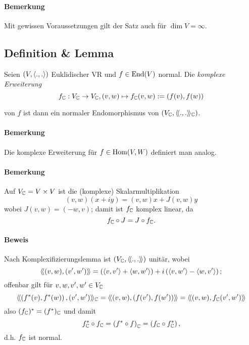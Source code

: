 \paragraph{Bemerkung}
	Mit gewissen Voraussetzungen gilt der Satz auch für $ \dim V = \infty $.

\subsection{Definition \& Lemma}
\begin{Definition}
	Seien $ (V,\langle .,. \rangle) $ Euklidischer VR und $ f\in \operatorname{End}(V) $ normal. Die \emph{komplexe Erweiterung} 
		\[ f_{\mathbb{C}}:V_{\mathbb{C}} \to V_{\mathbb{C}}, (v,w)\mapsto f_{\mathbb{C}}(v,w) := (f(v),f(w)) \]
\end{Definition}
\begin{Lemma}[]
	von $ f $ ist dann ein normaler Endomorphismus von $ (V_{\mathbb{C}},\langle\! \langle .,. \rangle\! \rangle_{\mathbb{C}}) $.
\end{Lemma}
\paragraph{Bemerkung}
	Die komplexe Erweiterung für $ f\in\operatorname{Hom}(V,W) $ definiert man analog.
\paragraph{Bemerkung}
	Auf $ V_{\mathbb{C}} = V\times V $ ist die (komplexe) Skalarmultiplikation
		\[ (v,w)(x+iy) = (v,w)x+J(v,w)y \]
	wobei $ J(v,w) = (-w,v) $; damit ist $ f_{\mathbb{C}} $ komplex linear, da 
		\[ f_{\mathbb{C}} \circ J = J\circ f_{\mathbb{C}}. \]
\paragraph{Beweis}
	Nach Komplexifizierungslemma ist $ (V_{\mathbb{C}},\langle\! \langle .,. \rangle\! \rangle) $ unitär, wobei
		\[ \langle\! \langle (v,w),(v',w') \rangle\! \rangle = \left(\langle v,v' \rangle+\langle w,w' \rangle\right)+i\left(\langle v,w' \rangle-\langle w,v' \rangle\right); \]
	offenbar gilt für $ v,w,v',w'\in V_{\mathbb{C}} $
		\[ \langle\! \langle \left(f^*(v),f^*(w)\right),(v',w') \rangle\! \rangle_{\mathbb{C}} = \langle\! \langle (v,w),\left(f(v'),f(w')\right) \rangle\! \rangle = \langle\! \langle (v,w),f_{\mathbb{C}}(v',w') \rangle\! \rangle \]
	also $ (f_{\mathbb{C}})^*=(f^*)_{\mathbb{C}} $ und damit
		\[ f_{\mathbb{C}}^* \circ f_{\mathbb{C}} = \left(f^* \circ f\right)_{\mathbb{C}} = \left(f_{\mathbb{C}} \circ f^*_{\mathbb{C}} \right), \]
	d.h. $ f_{\mathbb{C}} $ ist normal.

